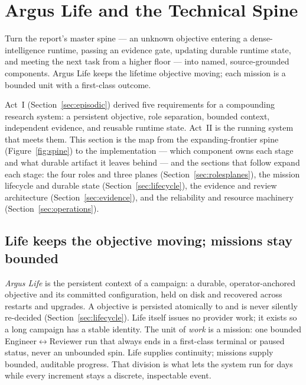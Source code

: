 \section{Argus Life and the Technical Spine}
\label{sec:life}

\begin{designbox}
Turn the report's master spine --- an unknown objective entering a
dense-intelligence runtime, passing an evidence gate, updating durable runtime
state, and meeting the next task from a higher floor --- into named, source-grounded
components. Argus Life keeps the lifetime objective moving; each mission is a
bounded unit with a first-class outcome.
\end{designbox}

Act~I (Section~\ref{sec:episodic}) derived five requirements for a compounding
research system: a persistent objective, role separation, bounded context,
independent evidence, and reusable runtime state. Act~II is the running system that
meets them. This section is the map from the expanding-frontier spine
(Figure~\ref{fig:spine}) to the implementation --- which component owns each stage
and what durable artifact it leaves behind --- and the sections that follow expand
each stage: the four roles and three planes (Section~\ref{sec:rolesplanes}), the
mission lifecycle and durable state (Section~\ref{sec:lifecycle}), the evidence and
review architecture (Section~\ref{sec:evidence}), and the reliability and resource
machinery (Section~\ref{sec:operations}).

\subsection{Life keeps the objective moving; missions stay bounded}

\emph{Argus Life} is the persistent context of a campaign: a durable,
operator-anchored objective and its committed configuration, held on disk and
recovered across restarts and upgrades. A  objective is persisted
atomically to  and is never silently re-decided
(Section~\ref{sec:lifecycle}). Life itself issues no provider work; it exists so a
long campaign has a stable identity. The unit of \emph{work} is a mission: one
bounded Engineer$\leftrightarrow$Reviewer run that always ends in a first-class
terminal or paused status, never an unbounded spin. Life supplies continuity;
missions supply bounded, auditable progress. That division is what lets the system
run for days while every increment stays a discrete, inspectable event.

